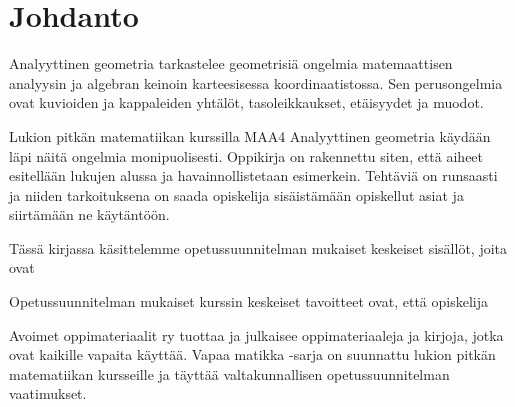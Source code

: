 \chapter{Johdanto}

Analyyttinen geometria tarkastelee geometrisiä ongelmia matemaattisen analyysin ja algebran keinoin karteesisessa koordinaatistossa. Sen perusongelmia ovat kuvioiden ja kappaleiden yhtälöt, tasoleikkaukset, etäisyydet ja muodot.

Lukion pitkän matematiikan kurssilla MAA4 Analyyttinen geometria käydään läpi näitä ongelmia monipuolisesti. Oppikirja on rakennettu siten, että aiheet esitellään lukujen alussa ja havainnollistetaan esimerkein. Tehtäviä on runsaasti ja niiden tarkoituksena on saada opiskelija sisäistämään opiskellut asiat ja siirtämään ne käytäntöön.

Tässä kirjassa käsittelemme opetussuunnitelman mukaiset keskeiset sisällöt, joita ovat

Opetussuunnitelman mukaiset kurssin keskeiset tavoitteet ovat, että opiskelija

Avoimet oppimateriaalit ry tuottaa ja julkaisee oppimateriaaleja ja kirjoja, jotka ovat kaikille vapaita käyttää. Vapaa matikka -sarja on suunnattu lukion pitkän matematiikan kursseille ja täyttää valtakunnallisen opetussuunnitelman vaatimukset.
